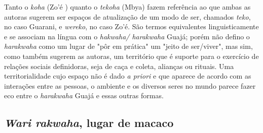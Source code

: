 Tanto o \emph{koha} (Zo'é ) quanto o \emph{tekoha} (Mbya) fazem
referência ao que ambas as autoras sugerem ser espaços de atualização de
um modo de ser, chamados \emph{teko}, no caso Guarani, e \emph{wereko},
no caso Zo'é. São termos equivalentes linguisticamente e se associam na
língua com o \emph{hakwaha/ harakwaha} Guajá; porém não defino o
\emph{harakwaha} como um lugar de "pôr em prática" um "jeito de
ser/viver", mas sim, como também sugerem as autoras, um território que é
suporte para o exercício de relações sociais definidoras, seja de caça e
coleta, alianças ou rituais. Uma territorialidade cujo espaço não é dado
\emph{a priori} e que aparece de acordo com as interações entre as
pessoas, o ambiente e os diversos seres no mundo parece fazer eco entre
o \emph{harakwaha} Guajá e essas outras formas.

\hypertarget{wari-rakwaha-lugar-de-macaco}{%
\subsection{\texorpdfstring{\emph{Wari rakwaha}, lugar de macaco
}{Wari rakwaha, lugar de macaco }}\label{wari-rakwaha-lugar-de-macaco}}

